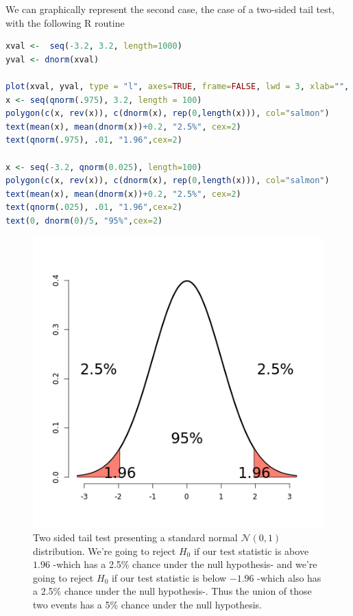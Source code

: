 \documentclass{homework}
\begin{document}
We can graphically represent the second case, the case of a two-sided tail test, with the following R routine

\begin{lstlisting}[language=R]
xval <-  seq(-3.2, 3.2, length=1000)
yval <- dnorm(xval)

plot(xval, yval, type = "l", axes=TRUE, frame=FALSE, lwd = 3, xlab="", ylab= "")
x <- seq(qnorm(.975), 3.2, length = 100)
polygon(c(x, rev(x)), c(dnorm(x), rep(0,length(x))), col="salmon")
text(mean(x), mean(dnorm(x))+0.2, "2.5%", cex=2)
text(qnorm(.975), .01, "1.96",cex=2)

x <- seq(-3.2, qnorm(0.025), length=100)
polygon(c(x, rev(x)), c(dnorm(x), rep(0,length(x))), col="salmon")
text(mean(x), mean(dnorm(x))+0.2, "2.5%", cex=2)
text(qnorm(.025), .01, "1.96",cex=2)
text(0, dnorm(0)/5, "95%",cex=2)
\end{lstlisting}

\begin{figure}
    \centering
    \includegraphics[scale = 0.4]{figs/two sided tail test.png}
    \caption{Two sided tail test presenting a standard normal $\mathcal{N}(0,1)$ distribution. We're going to reject $H_0$ if our test statistic is above $1.96$ -which has a 2.5\% chance under the null hypothesis- and we're going to reject $H_0$ if our test statistic is below $-1.96$ -which also has a 2.5\% chance under the null hypothesis-. Thus the union of those two events has a 5\% chance under the null hypothesis. }
    \label{fig:my_label}
\end{figure}
\end{document}

